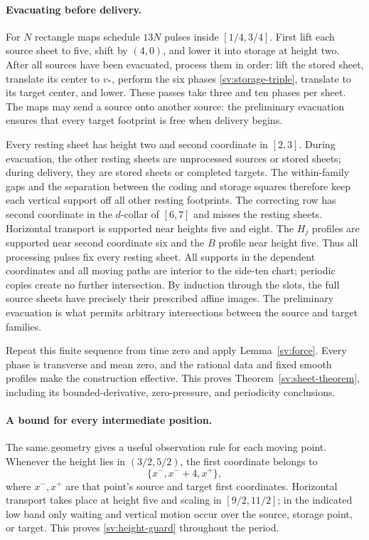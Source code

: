 

\paragraph{Evacuating before delivery.}
For $N$ rectangle maps schedule $13N$ pulses inside $[1/4,3/4]$.
First lift each source sheet to five, shift by $(4,0)$, and lower
it into storage at height two.  After all sources have been evacuated,
process them in order: lift the stored sheet, translate its center to
$v_*$, perform the six phases \eqref{sv:storage-triple}, translate
to its target center, and lower.  These passes take three and ten
phases per sheet.  The maps may send a source onto another source:
the preliminary evacuation ensures that every target footprint is free
when delivery begins.

Every resting sheet has height two and second coordinate in $[2,3]$.
During evacuation, the other resting sheets are unprocessed sources
or stored sheets; during delivery, they are stored sheets or completed
targets.  The within-family gaps and the separation between the coding
and storage squares therefore keep each vertical support off all other
resting footprints.  The correcting row has second coordinate in the
$d$-collar of $[6,7]$ and misses the resting sheets.  Horizontal transport
is supported near heights five and eight.  The $H_j$ profiles are
supported near second coordinate six and the $B$ profile near height
five.  Thus all processing pulses fix every resting sheet.  All supports
in the dependent coordinates and all moving paths are interior to the side-ten chart;
periodic copies create no further intersection.  By induction through
the slots, the full source sheets have precisely their prescribed
affine images.  The preliminary evacuation is what permits arbitrary
intersections between the source and target families.

Repeat this finite sequence from time zero and apply
Lemma~\ref{sv:force}.  Every phase is transverse and mean zero, and
the rational data and fixed smooth profiles make the construction
effective.  This proves Theorem~\ref{sv:sheet-theorem}, including
its bounded-derivative, zero-pressure, and periodicity conclusions.

\paragraph{A bound for every intermediate position.}
The same geometry gives a useful observation rule for each moving point.
Whenever the height
lies in $(3/2,5/2)$, the first coordinate belongs to
\begin{equation}\label{sv:height-guard}
 \{x^-,x^-+4,x^+\},
\end{equation}
where $x^-,x^+$ are that point's source and target first coordinates.
Horizontal transport takes place at height five and scaling in
$[9/2,11/2]$; in the indicated low band only waiting and vertical
motion occur over the source, storage point, or target.  This proves
\eqref{sv:height-guard} throughout the period.

